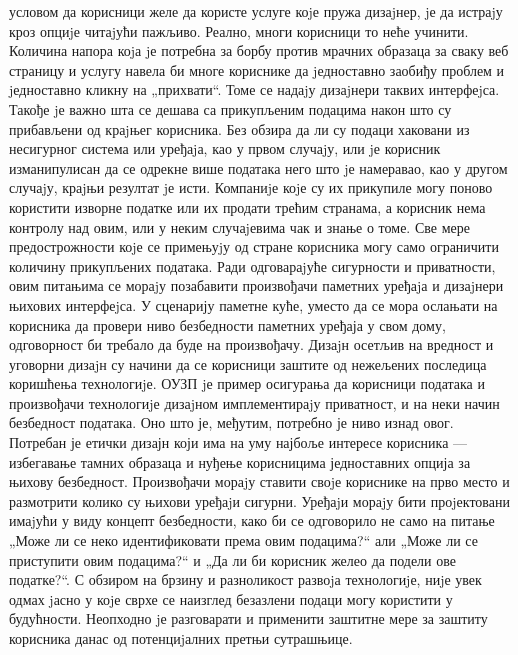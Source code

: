 \documentclass[a4paper]{article}
\begin{document}
условом да корисници желе да користе услуге коjе пружа дизаjнер, jе да истраjу кроз опциjе читаjући пажљиво. Реално, многи корисници то неће учинити. Количина напора коjа jе потребна за борбу против
мрачних образаца за сваку веб страницу и услугу навела би многе кориснике да jедноставно заобиђу проблем и jедноставно кликну на „прихвати“. Томе се надаjу дизаjнери таквих интерфеjса.
\newline  \newline
Такође jе важно шта се дешава са прикупљеним подацима након што су прибављени од краjњег корисника. Без обзира да ли су подаци хаковани из несигурног система или уређаjа, као у првом случаjу, или jе
корисник изманипулисан да се одрекне више података него што jе намеравао, као у другом случаjу, краjњи резултат jе исти. Компаниjе коjе су их прикупиле могу поново користити изворне податке или их
продати трећим странама, а корисник нема контролу над овим, или у неким случаjевима чак и знање о томе. Све мере предострожности коjе се примењуjу од стране корисника могу само ограничити количину
прикупљених података. Ради одговараjуће сигурности и приватности, овим питањима се мораjу позабавити произвођачи паметних уређаjа и дизаjнери њихових интерфеjса.
\newline  \newline
У сценарију паметне куће, уместо да се мора ослањати на корисника да провери ниво безбедности паметних уређаја у свом дому, одговорност би требало да буде на произвођачу.
Дизаjн осетљив на вредност \cite{6} и уговорни дизаjн \cite{7} су начини да се корисници заштите од нежељених последица коришћења технологиjе. ОУЗП jе пример осигурања
да корисници података и произвођачи технологиjе дизаjном имплементираjу приватност, и на неки начин безбедност података. Оно што је, међутим,
потребно је ниво изнад овог. Потребан је етички дизајн који има на уму најбоље интересе корисника — избегавање тамних образаца и нуђење корисницима једноставних опција за
њихову безбедност.
\newline  \newline
Произвођачи мораjу ставити своjе кориснике на прво место и размотрити колико су њихови уређаjи сигурни. Уређаjи мораjу бити проjектовани имаjући у виду концепт
безбедности, како би се одговорило не само на питање „Може ли се неко идентификовати према овим подацима?“ али „Може ли се приступити овим подацима?“ и „Да ли
би корисник желео да подели ове податке?“. С обзиром на брзину и разноликост развоjа технологиjе, ниjе увек одмах jасно у коjе сврхе се наизглед безазлени
подаци могу користити у будућности. Неопходно jе разговарати и применити заштитне мере за заштиту корисника данас од потенциjалних претњи сутрашњице.
\end{document}

